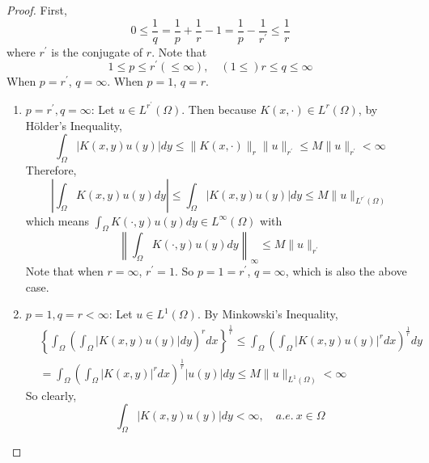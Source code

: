 \begin{proof}
	First,
	\begin{equation*}
		0 \leq \frac{1}{q}=\frac{1}{p}+\frac{1}{r}-1=\frac{1}{p}-\frac{1}{r^{\prime}} \leq \frac{1}{r}
	\end{equation*}
	where $r^\prime$ is the conjugate of $r$. Note that
	\begin{equation*}
		1 \leq p \leq r^{\prime}(\leq \infty), \quad(1 \leq) r \leq q \leq \infty
	\end{equation*}
	When $p = r^\prime$, $q = \infty$. When $p = 1$, $q = r$.
	\begin{enumerate}[label=(\roman*)]
		\item $p = r^\prime, q = \infty$: Let $u \in L^{r^\prime}(\Omega)$. Then because $K(x,\cdot) \in L^{r}(\Omega)$, by H\"older's Inequality,
		\begin{equation*}
			\int_{\Omega}|K(x, y) u(y)| d y \leq\|K(x, \cdot)\|_{r}\|u\|_{r^{\prime}} \leq M\|u\|_{r^{\prime}}<\infty
		\end{equation*}
		Therefore,
		\begin{equation*}
			\left|\int_{\Omega} K(x, y) u(y) d y\right| \leq \int_{\Omega}|K(x, y) u(y)| d y \leq M\|u\|_{L^{r^{\prime}}(\Omega)}
		\end{equation*}
		which means $\int_{\Omega} K(\cdot, y) u(y) d y \in L^{\infty}(\Omega)$ with
		\begin{equation*}
			\left\|\int_{\Omega} K(\cdot, y) u(y) d y\right\|_{\infty} \leq M\|u\|_{r^{\prime}}
		\end{equation*}
		Note that when $r = \infty$, $r^\prime = 1$. So $p = 1 = r^\prime$, $q = \infty$, which is also the above case.
		\item $p=1,q=r < \infty$: Let $u \in L^1(\Omega)$. By Minkowski's Inequality,
		\begin{equation*}
			\begin{aligned}
				& \left\{\int_{\Omega}\left(\int_{\Omega}|K(x, y) u(y)| d y\right)^r d x\right\}^{\frac{1}{r}} \leq \int_{\Omega}\left(\int_{\Omega}|K(x, y) u(y)|^r d x\right)^{\frac{1}{r}} d y \\
				& =\int_{\Omega}\left(\int_{\Omega}|K(x, y)|^r d x\right)^{\frac{1}{r}}|u(y)| d y \leq M\|u\|_{L^1(\Omega)}<\infty
			\end{aligned}
		\end{equation*}
		So clearly,
		\begin{equation*}
			\int_{\Omega}|K(x, y) u(y)| d y<\infty,\quad a.e.~x \in \Omega
		\end{equation*}

\end{enumerate}
\end{proof}
